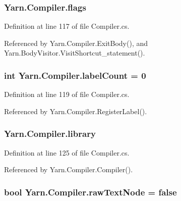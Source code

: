 \hypertarget{a00053_a541022d89bcf9bc8f794eb6d6b438d08}{
\subsubsection[{flags}]{ Yarn.\-Compiler.\-flags\hspace{0.3cm}{\ttfamily [package]}}}\label{a00053_a541022d89bcf9bc8f794eb6d6b438d08}


Definition at line 117 of file Compiler.\-cs.



Referenced by Yarn.\-Compiler.\-Exit\-Body(), and Yarn.\-Body\-Visitor.\-Visit\-Shortcut\-\_\-statement().

\hypertarget{a00053_a87758397eba2e84cda8e0d6c40656f3f}{
\subsubsection[{label\-Count}]{\setlength{\rightskip}{0pt plus 5cm}int Yarn.\-Compiler.\-label\-Count = 0\hspace{0.3cm}{\ttfamily [private]}}}\label{a00053_a87758397eba2e84cda8e0d6c40656f3f}


Definition at line 119 of file Compiler.\-cs.



Referenced by Yarn.\-Compiler.\-Register\-Label().

\hypertarget{a00053_ae211a0c080d18575bc3d299c207ef8ee}{
\subsubsection[{library}]{ Yarn.\-Compiler.\-library\hspace{0.3cm}{\ttfamily [package]}}}\label{a00053_ae211a0c080d18575bc3d299c207ef8ee}


Definition at line 125 of file Compiler.\-cs.



Referenced by Yarn.\-Compiler.\-Compiler().

\hypertarget{a00053_af6afc8ccb59931650919b863d62d52a4}{
\subsubsection[{raw\-Text\-Node}]{\setlength{\rightskip}{0pt plus 5cm}bool Yarn.\-Compiler.\-raw\-Text\-Node = false\hspace{0.3cm}{\ttfamily [package]}}}\label{a00053_af6afc8ccb59931650919b863d62d52a4}


